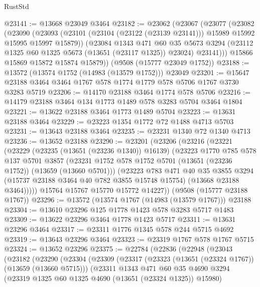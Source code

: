 \begin{lexlean}{RustStd}
\begin{coremodule}
@23141 := @13668 @23049 @3464
@23182 := @23062
    (@23067
      (@23077
        (@23082
          (@23090
            (@23093 (@23101 (@23104 (@23122 (@23139 @23141))) @15989 @15992 @15995 @15997 @15879))
            (@23084
              @1343
              @471
              @60
              @35
              @5673
              @3294
              (@23112 @1325 @60 @1325 @5673 (@13651 (@23117 @1325)) @23024)
              @23141)))
        @15866
        @15869
        @15872
        @15874
        @15879))
    (@9508 (@15777 @23049 @1752))
@23188 := @13572 (@13574 @1752 (@14983 (@13579 @1752))) @23049
@23201 := @15647 @23188 @3464 @3464 @1767 @578 @1774 @1779 @578 @5706 @1767 @3730 @3283 @5719
@23206 := @14170 @23188 @3464 @1774 @578 @5706
@23216 := @14179 @23188 @3464 @134 @1773 @1489 @578 @3283 @5704 @3464 @1804
@23221 := @13622 @23188 @3464 @1773 @1489 @5704
@23223 := @13631 @23188 @3464
@23229 := @23223 @1354 @1772 @72 @1488 @4713 @5703
@23231 := @13643 @23188 @3464
@23235 := @23231 @1340 @72 @1340 @4713
@23236 := @13652 @23188
@23290 := @23201
    (@23206
      (@23216
        (@23221
          (@23229
            (@23235 (@13651 (@23236 @1340)) @16139)
            (@23223
              @1770
              @785
              @578
              @137
              @5701
              @3857
              (@23231 @1752 @578 @1752 @5701 (@13651 (@23236 @1752)) (@13659 (@13660 @5701)))
              (@23223
                @783
                @471
                @40
                @35
                @3855
                @3294
                (@15737 @23188 @3464 @40 @782 @3855 @15748 @15754)
                (@13668 @23188 @3464)))))
        @15764
        @15767
        @15770
        @15772
        @14227))
    (@9508 (@15777 @23188 @1767))
@23296 := @13572 (@13574 @1767 (@14983 (@13579 @1767))) @23188
@23304 := @13610 @23296 @125 @1778 @1423 @578 @3283 @5717 @1483
@23309 := @13622 @23296 @3464 @1778 @1423 @5717
@23311 := @13631 @23296 @3464
@23317 := @23311 @1776 @1345 @578 @244 @5715 @4692
@23319 := @13643 @23296 @3464
@23323 := @23319 @1767 @578 @1767 @5715
@23324 := @13652 @23296
@23375 := @22784
    (@22836
      (@22948
        (@23043
          (@23182
            (@23290
              (@23304
                (@23309
                  (@23317
                    (@23323 (@13651 (@23324 @1767)) (@13659 (@13660 @5715)))
                    (@23311
                      @1343
                      @471
                      @60
                      @35
                      @4690
                      @3294
                      (@23319 @1325 @60 @1325 @4690 (@13651 (@23324 @1325)) @15980)

\end{coremodule}
\end{lexlean}
